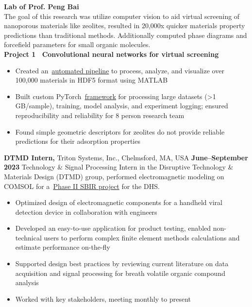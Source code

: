 \documentclass[margin,line]{res}
\begin{document}
\begin{resume}
	\begin{adjustwidth}{1.5em}{0pt}
		{\bf Lab of Prof. Peng Bai}\\
		The goal of this research was utilize computer vision to aid virtual
		screening of nanoporous materials like zeolites, resulted in 20,000x
		quicker materials property predictions than traditional methods.
		Additionally computed phase diagrams and forcefield parameters for small
		organic molecules.
		\\
		{\bf Project 1~\textendash{} Convolutional neural networks for virtual
		screening}
		\begin{itemize}
			\item Created
			      an~\href{https://github.com/samuelhoover/energy-grid-processing}{automated
				      pipeline} to process, analyze, and visualize over 100,000 materials in
			      HDF5 format using MATLAB
			\item Built custom
			      PyTorch~\href{https://github.com/samuelhoover/chan-ml}{framework}
			      for processing large datasets (>1 GB/sample), training, model
			      analysis, and experiment logging; ensured reproducibility and
			      reliability for 8 person research team
			\item Found simple geometric descriptors for zeolites do not provide
			      reliable predictions for their adsorption properties
		\end{itemize}
	\end{adjustwidth}
	{\bf DTMD Intern,} Triton Systems, Inc., Chelmsford, MA, USA
	\hfill {\bf June--September 2023}
	Technology \& Signal Processing Intern in the Disruptive Technology \&
	Materials Design (DTMD) group, performed electromagnetic modeling on COMSOL
	for a~\href{https://legacy.www.sbir.gov/sbirsearch/detail/2234557}{Phase II
		SBIR project} for the DHS.
	\begin{itemize}
		\item Optimized design of electromagnetic components for a handheld viral
		      detection device in collaboration with engineers
		\item Developed an easy-to-use application for product testing,
		      enabled non-technical users to perform complex finite element methods
		      calculations and estimate performance on-the-fly
		\item Supported design best practices by reviewing current literature on
		      data acquisition and signal processing for breath volatile organic
		      compound analysis
		\item Worked with key stakeholders, meeting monthly to present

\end{itemize}
\end{resume}
\end{document}
